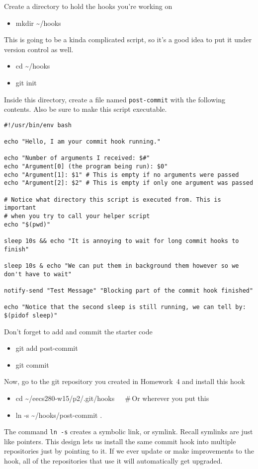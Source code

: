 \documentclass{article}
\begin{document}
\medskip
\noindent
Create a directory to hold the hooks you're working on
\begin{itemize}\tt
  \item mkdir \textasciitilde/hooks
\end{itemize}
This is going to be a kinda complicated script, so it's a good
idea to put it under version control as well.
\begin{itemize}\tt
  \item cd \textasciitilde/hooks
  \item git init
\end{itemize}
Inside this directory, create a file named \texttt{post-commit} with the
following contents.  Also be sure to make this script executable.
\begin{lstlisting}
#!/usr/bin/env bash

echo "Hello, I am your commit hook running."

echo "Number of arguments I received: $#"
echo "Argument[0] (the program being run): $0"
echo "Argument[1]: $1" # This is empty if no arguments were passed
echo "Argument[2]: $2" # This is empty if only one argument was passed

# Notice what directory this script is executed from. This is important
# when you try to call your helper script
echo "$(pwd)"

sleep 10s && echo "It is annoying to wait for long commit hooks to finish"

sleep 10s & echo "We can put them in background them however so we don't have to wait"

notify-send "Test Message" "Blocking part of the commit hook finished"

echo "Notice that the second sleep is still running, we can tell by: $(pidof sleep)"
\end{lstlisting}
%
Don't forget to add and commit the starter code
\begin{itemize}\tt
  \item git add post-commit
  \item git commit
\end{itemize}
%
Now, go to the git repository you created in Homework~4 and install this hook
\begin{itemize}\tt
  \item cd \textasciitilde/eecs280-w15/p2/.git/hooks~~~\#\,Or wherever you put this
  \item ln -s \textasciitilde/hooks/post-commit .
\end{itemize}
The command \texttt{ln -s} creates a symbolic link, or symlink. Recall
symlinks are just like pointers. This design lets us install the same commit
hook into multiple repositories just by pointing to it. If we ever update or
make improvements to the hook, all of the repositories that use it will
automatically get upgraded.
\end{document}
